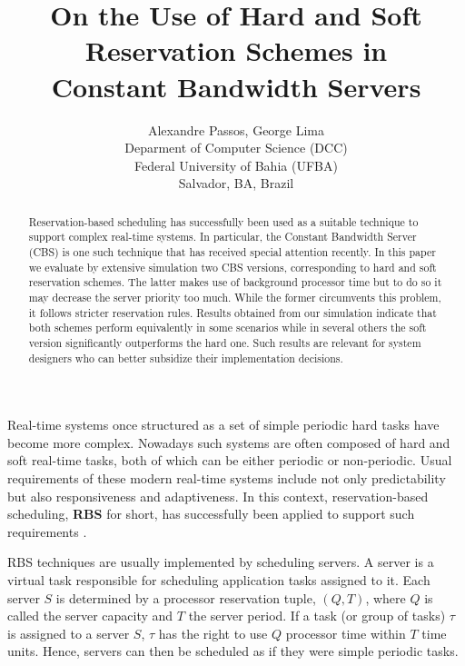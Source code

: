 \documentclass[times, 10pt,twocolumn]{article}
\author{Alexandre Passos, George Lima \\
  Deparment of Computer Science (DCC) \\
  Federal University of Bahia (UFBA) \\
  Salvador, BA, Brazil
}
\title{On the Use of Hard and Soft Reservation Schemes in \\ Constant Bandwidth Servers}
\begin{document}
\graphicspath{{figs/}{data/}}

\maketitle

\begin{abstract}

  Reservation-based scheduling has successfully been used as a
  suitable technique to support complex real-time systems. In
  particular, the Constant Bandwidth Server (CBS) is one such
  technique that has received special attention recently. In this
  paper we evaluate by extensive simulation two CBS versions,
  corresponding to hard and soft reservation schemes. The latter makes
  use of background processor time but to do so it may decrease the
  server priority too much. While the former circumvents this problem,
  it follows stricter reservation rules. Results obtained from our
  simulation indicate that both schemes perform equivalently in some
  scenarios while in several others the soft version significantly
  outperforms the hard one. Such results are relevant for system
  designers who can better subsidize their implementation decisions.

\end{abstract}

\label{sec:introduction}

Real-time systems once structured as a set of
simple periodic hard tasks \cite{liu.ea73:scheduling} have become more
complex. Nowadays such systems are often composed of hard and soft
real-time tasks, both of which can be either periodic or non-periodic.
Usual requirements of these modern real-time systems include not only
predictability but also responsiveness and adaptiveness. In this
context, reservation-based scheduling, \textbf{RBS} for short, has
successfully been applied to support such requirements
\cite{abeni.ea04:resource,mercer.ea94:processor,rajkumar.ea98:resource,sprunt.ea89:aperiodic,steffens.ea03:resource}.

RBS techniques are usually implemented by scheduling servers. A server
is a virtual task responsible for scheduling application tasks
assigned to it.  Each server $S$ is determined by a processor
reservation tuple, $(Q,T)$, where $Q$ is called the server capacity
and $T$ the server period.  If a task (or group of tasks) $\tau$ is
assigned to a server $S$, $\tau$ has the right to use $Q$ processor
time within $T$ time units. Hence, servers can then be scheduled as if
they were simple periodic tasks.
\end{document}
